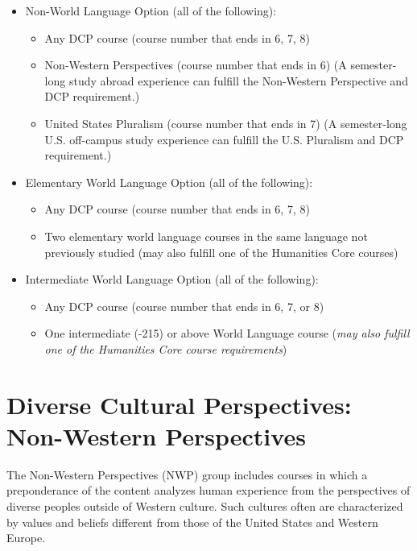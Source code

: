 \documentclass[
  letterpaper,
]{scrbook}
\providecommand{\tightlist}{%
  \setlength{\itemsep}{0pt}\setlength{\parskip}{0pt}}
\begin{document}
\begin{itemize}
\tightlist
\item
  Non-World Language Option (all of the following):

  \begin{itemize}
  \tightlist
  \item
    Any DCP course (course number that ends in 6, 7, 8)
  \item
    Non-Western Perspectives (course number that ends in 6) (A
    semester-long study abroad experience can fulfill the Non-Western
    Perspective and DCP requirement.)
  \item
    United States Pluralism (course number that ends in 7) (A
    semester-long U.S. off-campus study experience can fulfill the U.S.
    Pluralism and DCP requirement.)
  \end{itemize}
\item
  Elementary World Language Option (all of the following):

  \begin{itemize}
  \tightlist
  \item
    Any DCP course (course number that ends in 6, 7, 8)
  \item
    Two elementary world language courses in the same language not
    previously studied (may also fulfill one of the Humanities Core
    courses)
  \end{itemize}
\item
  Intermediate World Language Option (all of the following):

  \begin{itemize}
  \tightlist
  \item
    Any DCP course (course number that ends in 6, 7, or 8)
  \item
    One intermediate (-215) or above World Language course (\emph{may
    also fulfill one of the Humanities Core course requirements})
  \end{itemize}
\end{itemize}

\section{Diverse Cultural Perspectives: Non-Western
Perspectives}\label{sec-diverse-cultural-perspectives-non-western}

The Non-Western Perspectives (NWP) group includes courses in which a
preponderance of the content analyzes human experience from the
perspectives of diverse peoples outside of Western culture. Such
cultures often are characterized by values and beliefs different from
those of the United States and Western Europe.
\end{document}
